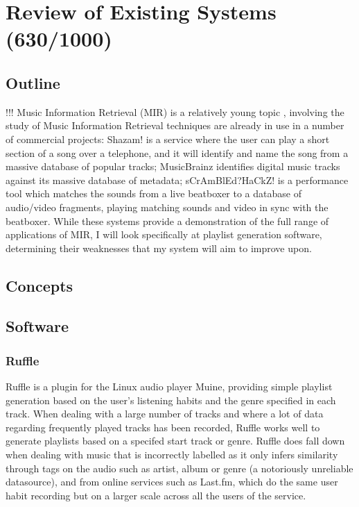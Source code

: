 \chapter{Review of Existing Systems (630/1000)}
\section{Outline}
\begin{comment}
	you need to state what MIR is  
and then go on to tell the person what programs do it 
because atm all ur saying is "i will be using MIR and these people are already using it" 
range of applications of MIR 
you havent said what the applications are
\end{comment}
!!!
Music Information Retrieval (MIR) is a relatively young topic \citep{Fingerhut2004}, involving the study of 
Music Information Retrieval techniques are already in use in a number of commercial projects: Shazam! is a service where the user can play a short section of a song over a telephone, and it will identify and name the song from a massive database of popular tracks; MusicBrainz identifies digital music tracks against its massive database of metadata; sCrAmBlEd?HaCkZ! is a performance tool which matches the sounds from a live beatboxer to a database of audio/video fragments, playing matching sounds and video in sync with the beatboxer. While these systems provide a demonstration of the full range of applications of MIR, I will look specifically at playlist generation software, determining their weaknesses that my system will aim to improve upon.
\section{Concepts}
\section{Software}
\subsection{Ruffle}
Ruffle is a plugin for the Linux audio player Muine, providing simple playlist generation based on the user's listening habits and the genre specified in each track. When dealing with a large number of tracks and where a lot of data regarding frequently played tracks has been recorded, Ruffle works well to generate playlists based on a specifed start track or genre. Ruffle does fall down when dealing with music that is incorrectly labelled as it only infers similarity through tags on the audio such as artist, album or genre (a notoriously unreliable datasource), and from online services such as Last.fm, which do the same user habit recording but on a larger scale across all the users of the service.
